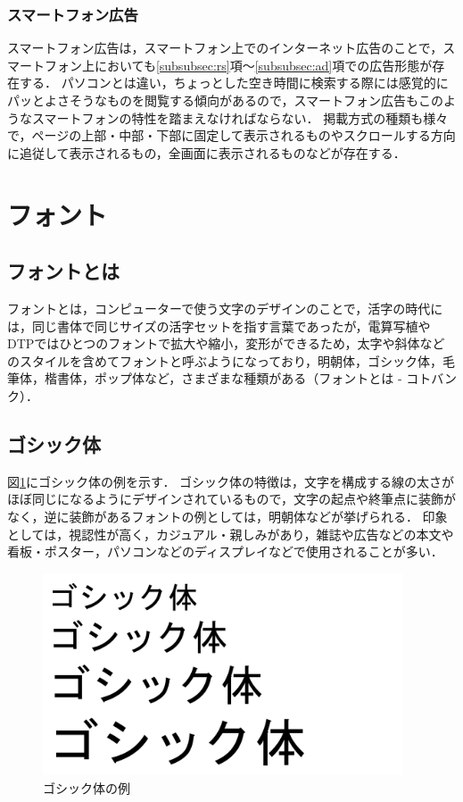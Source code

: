 \documentclass[12pt,a4j,titlepage]{ltjsarticle}
\begin{document}
\subsubsection{スマートフォン広告}
\label{subsubsec:sf}
スマートフォン広告は，スマートフォン上でのインターネット広告のことで，スマートフォン上においても\ref{subsubsec:rs}項～\ref{subsubsec:ad}項での広告形態が存在する．
パソコンとは違い，ちょっとした空き時間に検索する際には感覚的にパッとよさそうなものを閲覧する傾向があるので，スマートフォン広告もこのようなスマートフォンの特性を踏まえなければならない\cite{smartphone}．
掲載方式の種類も様々で，ページの上部・中部・下部に固定して表示されるものやスクロールする方向に追従して表示されるもの，全画面に表示されるものなどが存在する．

\clearpage

\section{フォント}
\subsection{フォントとは}
フォントとは，コンピューターで使う文字のデザインのことで，活字の時代には，同じ書体で同じサイズの活字セットを指す言葉であったが，電算写植やDTPではひとつのフォントで拡大や縮小，変形ができるため，太字や斜体などのスタイルを含めてフォントと呼ぶようになっており，明朝体，ゴシック体，毛筆体，楷書体，ポップ体など，さまざまな種類がある（フォントとは - コトバンク）．

\subsection{ゴシック体}
図\ref{fig:ゴシック体の例}にゴシック体の例を示す．
ゴシック体の特徴は，文字を構成する線の太さがほぼ同じになるようにデザインされているもので，文字の起点や終筆点に装飾がなく，逆に装飾があるフォントの例としては，明朝体などが挙げられる\cite{gk}．
印象としては，視認性が高く，カジュアル・親しみがあり，雑誌や広告などの本文や看板・ポスター，パソコンなどのディスプレイなどで使用されることが多い．

\begin{figure}[H]
\begin{center}
 \includegraphics[height=60mm]{figures/ゴシック体の例.pdf}
\end{center}
 \caption{ゴシック体の例}
 \label{fig:ゴシック体の例}
\end{figure}
\end{document}
